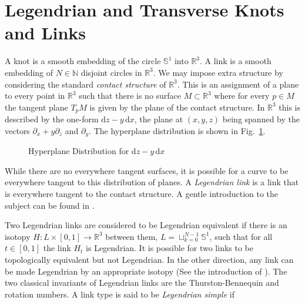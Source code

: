 \documentclass{article}
\theoremstyle{plain}
\begin{document}
    \section{Legendrian and Transverse Knots and Links}
        A knot is a smooth embedding of the circle $\mathbb{S}^{1}$ into
        $\mathbb{R}^{3}$. A link is a smooth embedding of $N\in\mathbb{N}$
        disjoint circles in $\mathbb{R}^{3}$. We may impose
        extra structure by considering the standard \textit{contact structure}
        of $\mathbb{R}^{3}$. This is an assignment
        of a plane to every point in $\mathbb{R}^{3}$ such that there is no
        surface $M\subset\mathbb{R}^{3}$ where for every $p\in{M}$ the tangent
        plane $T_{p}M$ is given by the plane of the contact structure. In
        $\mathbb{R}^{3}$ this is described by the one-form
        $\textrm{d}z-y\,\textrm{d}x$, the plane at $(x,y,z)$ being spanned by
        the vectors $\partial_{x}+y\partial_{z}$ and $\partial_{y}$. The
        hyperplane distribution is shown in Fig.~\ref{fig:darboux_form_001}.
        \begin{figure}
            \centering
            \caption{Hyperplane Distribution for $\textrm{d}z-y\,\textrm{d}x$}
            \label{fig:darboux_form_001}
        \end{figure}
        While there are no everywhere tangent surfaces, it is possible for a
        curve to be everywhere tangent to this distribution of planes.
        A \textit{Legendrian link} is a link that is everywhere tangent to
        the contact structure. A gentle introduction to the subject can be found
        in \cite{JoshuaMSabloffWhatIsLegendrianKnot}.
        \par\hfill\par
        Two Legendrian links are considered to be Legendrian equivalent if
        there is an isotopy $H:L\times[0,1]\rightarrow\mathbb{R}^{3}$ between
        them, $L=\sqcup_{k=0}^{N-1}\mathbb{S}^{1}$, such that for all
        $t\in[0,1]$ the link $H_{t}$ is Legendrian. It is possible for two links
        to be topologically equivalent but not Legendrian. In the other
        direction, any link can be made Legendrian by an appropriate isotopy
        (See the introduction of \cite{VeraVertessiTransNonSimpleKnots}). The
        two classical invariants of Legendrian links are the Thurston-Bennequin
        and rotation numbers.
        A link type is said to be \textit{Legendrian simple} if
\end{document}

